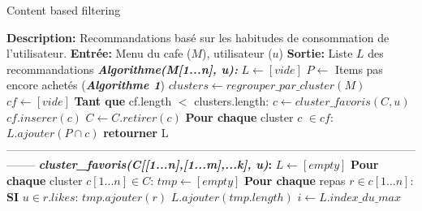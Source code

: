 \documentclass[11pt]{article}
\begin{document}
\begin{algorithm}
    \caption{Content based filtering}
    \begin{algorithmic}[1]
        \Statex \textbf{Description:} Recommandations basé sur les habitudes de consommation de l'utilisateur.
        \Statex \textbf{Entrée:} Menu du cafe ($M$), utilisateur ($u$)
        \Statex \textbf{Sortie:} Liste $L$ des recommandations
        \State \textbf{\textit{Algorithme(M[1...n], u):}}
        \State \hspace{0.5cm} $L \leftarrow [vide]$
        \State \hspace{0.5cm} $P \leftarrow$ Items pas encore achetés (\textbf{\textit{Algorithme 1}})
        \State \hspace{0.5cm} $clusters \leftarrow regrouper\_par\_cluster(M)$
        \State \hspace{0.5cm} $cf \leftarrow [vide]$
        \State \hspace{0.5cm} \textbf{Tant que} cf.length $<$ clusters.length:
        \State \hspace{1cm} $c \leftarrow cluster\_favoris(C, u)$
        \State \hspace{1cm} $cf.inserer(c)$
        \State \hspace{1cm} $C \leftarrow C.retirer(c)$
        \State \hspace{0.5cm} \textbf{Pour chaque} cluster $c$ $\in cf$:
        \State \hspace{1cm} $L.ajouter(P \cap c)$
        \State \hspace{0.5cm} \textbf{retourner} L
        \\
--------------------------------------------------------------------------------------------------------------------
        \State \textbf{\textit{cluster\_favoris(C[[1...n],[1...m],...k], u)}:}
        \State \hspace{0.5cm} $L \leftarrow [empty]$
        \State \hspace{0.5cm} \textbf{Pour chaque} cluster $c[1...n] \in C$:
        \State \hspace{1cm} $tmp \leftarrow [empty]$
        \State \hspace{1cm} \textbf{Pour chaque} repas $r \in c[1...n]$: 
        \State \hspace{2cm} \textbf{SI} $u \in r.likes$:
        \State \hspace{2.5cm} $tmp.ajouter(r)$
        \State \hspace{1cm} $L.ajouter(tmp.length)$
        \State \hspace{0.5cm} $i \leftarrow L.index\_du\_max$

\end{algorithmic}
\end{algorithm}
\end{document}
